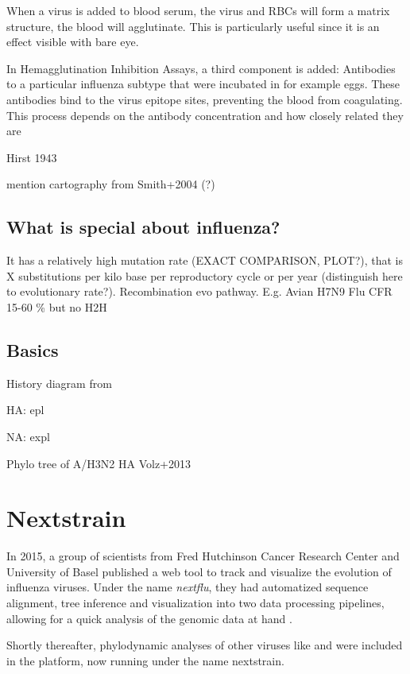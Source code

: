 \documentclass[12pt]{scrartcl}
\begin{document}
    When a virus is added to blood serum, the virus and RBCs will form a matrix structure, the blood will agglutinate. This is particularly useful since it is an effect visible with bare eye.

    In Hemagglutination Inhibition Assays, a third component is added: Antibodies to a particular influenza subtype that were incubated in for example eggs. These antibodies bind to the virus epitope sites, preventing the blood from coagulating. This process depends on the antibody concentration and how closely related they are

    Hirst 1943

    mention cartography from Smith+2004 (?) 

  \subsection{What is special about influenza?}

    It has a relatively high mutation rate (EXACT COMPARISON, PLOT?), that is X substitutions per kilo base per reproductory cycle or per year (distinguish here to evolutionary rate?). 
    Recombination evo pathway. E.g. Avian H7N9 Flu CFR 15-60 \% but no H2H


  \subsection{Basics}

    History diagram from \citep{alberts15}

    HA: epl

    NA: expl

    Phylo tree of A/H3N2 HA Volz+2013


\section{Nextstrain} \label{nextstrain}

  In 2015, a group of scientists from Fred Hutchinson Cancer Research Center and University of Basel published a web tool to track and visualize the evolution of influenza viruses. Under the name \textit{nextflu}, they had automatized sequence alignment, tree inference and visualization into two data processing pipelines, allowing for a quick analysis of the genomic data at hand \citep{neherBedford15a}.

  Shortly thereafter, phylodynamic analyses of other viruses like  and  were included in the platform, now running under the name nextstrain.
\end{document}
